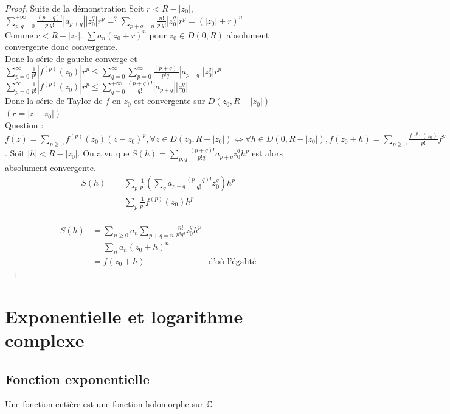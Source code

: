 \documentclass[]{report}
\begin{document}
\begin{proof}{Suite de la démonstration}{}
    Soit $r<R-|z_0|$, $\sum_{p,q=0}^{+\infty}\frac{(p+q)!}{p!q!}|a_{p+q}||z_0^q|r^p=^?\sum_{p+q=n}\frac{n!}{p!q!}|z_0^q|r^p=(|z_0|+r)^n$\\
    Comme $r<R-|z_0|$. $\sum a_n(z_0+r)^n$ pour $z_0\in D(0,R)$ absolument convergente donc convergente.\\
    Donc la série de gauche converge et \\
    $\sum_{p=0}^{\infty}\frac{1}{p!}|f^{(p)}(z_0)|r^p\le\sum_{q=0}^{\infty}\sum_{p=0}^{\infty}\frac{(p+q)!}{p!q!}|a_{p+q}||z_0^q|r^p$\\
    $\sum_{p=0}^{\infty}\frac{1}{p!}|f^{(p)}(z_0)|r^p\le \sum_{q=0}^{+\infty}\frac{(p+q)!}{q!}|a_{p+q}||z_0^q|$\\
    Donc la série de Taylor de $f$ en $z_0$ est convergente sur $D(z_0,R-|z_0|)$ $(r=|z-z_0|)$\\
    Question : $f(z)=\sum_{p\ge0}f^{(p)}(z_0)(z-z_0)^p,\forall z\in D(z_0,R-|z_0|)\iff \forall h \in D(0,R-|z_0|),f(z_0+h)=\sum_{p\ge 0}\frac{f^{(p)}(z_0)}{p!}f^p$. Soit $|h|<R-|z_0|$. On a vu que $S(h)=\sum_{p,q}\frac{(p+q)!}{p!q!}a_{p+q}z_0^qh^p$ est alors absolument convergente.\\
    \begin{align*}
S(h) & = \sum_{p}\frac{1}{p!}(\sum_{q}a_{p+q}\frac{(p+q)!}{q!}z_0^q)h^p\\
& =\sum_{p} \frac{1}{p!}f^{(p)}(z_0)h^p
\end{align*}\\
     \begin{align*}
S(h) & = \sum_{n\ge0}a_n\sum_{p+q=n}\frac{n!}{p!q!}z_0^qh^p \\
& = \sum_n a_n (z_0+h)^n \\
&=f(z_0+h) & \text{d'où l'égalité}
\end{align*}
\end{proof}

\chapter{Exponentielle et logarithme complexe}

\section{Fonction exponentielle}

\begin{df}{}{}
    Une fonction entière est une fonction holomorphe sur $\mathbb{C}$
\end{df}
\end{document}
